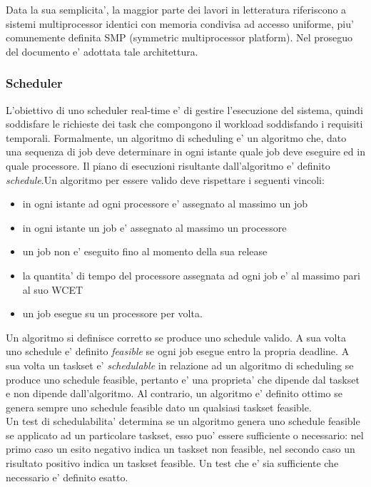 Data la sua semplicita', la maggior parte dei lavori in letteratura riferiscono a sistemi multiprocessor identici con memoria condivisa ad accesso uniforme, piu' comunemente definita SMP (symmetric multiprocessor platform). Nel proseguo del documento e' adottata tale architettura.

\subsubsection{Scheduler}
\label{sec:overviewSCHED}

L'obiettivo di uno scheduler real-time e' di gestire l'esecuzione del sistema, quindi soddisfare le richieste dei task che compongono il workload soddisfando i requisiti temporali. Formalmente, un algoritmo di scheduling e' un algoritmo che, dato una sequenza di job deve determinare in ogni istante quale job deve eseguire ed in quale processore. Il piano di esecuzioni risultante dall'algoritmo e' definito \textit{schedule}.Un algoritmo per essere valido deve rispettare i seguenti vincoli:\\

\begin{itemize}
	\item in ogni istante ad ogni processore e' assegnato al massimo un job 
	\item in ogni istante un job e' assegnato al massimo un processore
	\item un job non e' eseguito fino al momento della sua release
	\item la quantita' di tempo del processore assegnata ad ogni job e' al massimo pari al suo WCET
	\item un job esegue su un processore per volta.
\end{itemize}

Un algoritmo si definisce corretto se produce uno schedule valido. A sua volta uno schedule e' definito \textit{feasible} se ogni job esegue entro la propria deadline. A sua volta un taskset e' \textit{schedulable} in relazione ad un algoritmo di scheduling se produce uno schedule feasible, pertanto e' una proprieta' che dipende dal taskset e non dipende dall'algoritmo. Al contrario, un algoritmo e' definito ottimo se genera sempre uno schedule feasible dato un qualsiasi taskset feasible.\\

Un test di schedulabilita' determina se un algoritmo genera uno schedule feasible se applicato ad un particolare taskset, esso puo' essere sufficiente o necessario: nel primo caso un esito negativo indica un taskset non feasible, nel secondo caso un risultato positivo indica un taskset feasible. Un test che e' sia sufficiente che necessario e' definito esatto.\\


